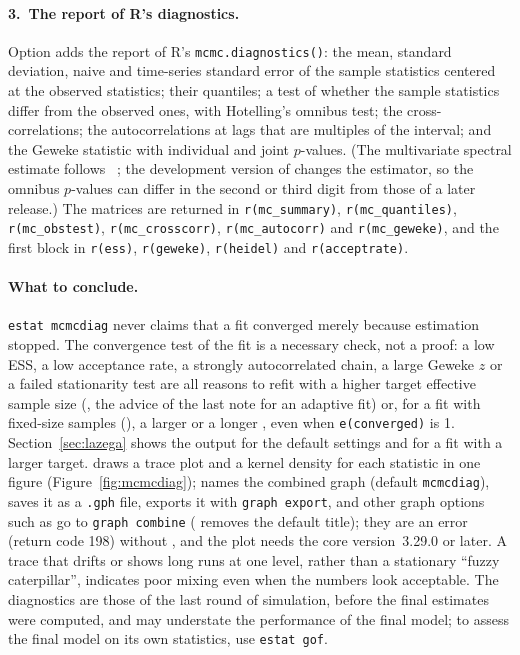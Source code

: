 \paragraph{3.\ The report of R's diagnostics.} Option  adds the report of R's \texttt{mcmc.diagnostics()}: the mean, standard deviation, naive and time-series standard error of the sample statistics centered at the observed statistics; their quantiles; a test of whether the sample statistics differ from the observed ones, with Hotelling's omnibus test; the cross-correlations; the autocorrelations at lags that are multiples of the interval; and the Geweke statistic with individual and joint $p$-values. (The multivariate spectral estimate follows \ergm{}~\ergmver{}; the development version of \ergm{} changes the estimator, so the omnibus $p$-values can differ in the second or third digit from those of a later release.) The matrices are returned in \texttt{r(mc\_summary)}, \texttt{r(mc\_quantiles)}, \texttt{r(mc\_obstest)}, \texttt{r(mc\_crosscorr)}, \texttt{r(mc\_autocorr)} and \texttt{r(mc\_geweke)}, and the first block in \texttt{r(ess)}, \texttt{r(geweke)}, \texttt{r(heidel)} and \texttt{r(acceptrate)}.

\paragraph{What to conclude.} \texttt{estat mcmcdiag} never claims that a fit converged merely because estimation stopped. The convergence test of the fit is a necessary check, not a proof: a low ESS, a low acceptance rate, a strongly autocorrelated chain, a large Geweke $z$ or a failed stationarity test are all reasons to refit with a higher target effective sample size (, the advice of the last note for an adaptive fit) or, for a fit with fixed-size samples (), a larger  or a longer , even when \texttt{e(converged)} is 1. Section~\ref{sec:lazega} shows the output for the default settings and for a fit with a larger target.  draws a trace plot and a kernel density for each statistic in one figure (Figure~\ref{fig:mcmcdiag});  names the combined graph (default \texttt{mcmcdiag}),  saves it as a \texttt{.gph} file,  exports it with \texttt{graph export}, and other graph options such as  go to \texttt{graph combine} ( removes the default title); they are an error (return code 198) without , and the plot needs the core version~3.29.0 or later. A trace that drifts or shows long runs at one level, rather than a stationary ``fuzzy caterpillar'', indicates poor mixing even when the numbers look acceptable. The diagnostics are those of the last round of simulation, before the final estimates were computed, and may understate the performance of the final model; to assess the final model on its own statistics, use \texttt{estat gof}.

